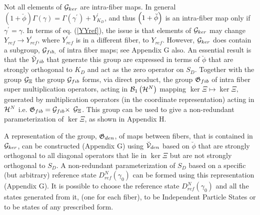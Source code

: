 Not all elements of ${\cal G}_{ker}$ are intra-fiber maps. In general $%
\left( 1+\breve{\phi}\right) \Gamma \left( \gamma \right) =\Gamma \left(
\gamma ^{\prime }\right) +Y_{K_{D}}^{\prime }$, and thus $\left( 1+\breve{%
\phi}\right) $ is an intra-fiber map only if $\gamma ^{\prime }=\gamma $. In
terms of eq. (\ref{YYref}), the issue is that elements of ${\cal G}_{ker}$
may change $Y_{ref}\rightarrow Y_{ref}^{\prime }$, where $Y_{ref}^{\prime }$
is in a different fiber, to $Y_{ref}$. However, ${\cal G}_{ker}$ does
contain a subgroup, ${\cal G}_{fib\text{,}}$ of intra fiber maps; see
Appendix G also. An essential result is that the ${\cal \breve{V}}_{fib}$
that generate this group are expressed in terms of $\breve{\phi}$ that are
strongly orthogonal to $K_{D}$ and act as the zero operator on $S_{D}$.
Together with the group ${\cal G}_{\Xi }$ the group ${\cal G}_{fib}$ forms,
via direct product, the group ${\frak G}_{fib}$ of intra fiber super
multiplication operators, acting in ${\cal B}_{1}\left( {\cal H}^{N}\right) $
mapping $\ker \Xi \mapsto \ker \Xi ,$ generated by multiplication operators
(in the coordinate representation) acting in ${\cal H}^{N}$ i.e. ${\frak G}%
_{fib}={\cal G}_{fib}\times $ ${\cal G}_{\Xi }$. This group can be used to
give a non-redundant parameterization of $\ker \Xi $, as shown in Appendix H.

A representation of the group, ${\frak G}_{den}$, of maps between fibers,
that is contained in ${\cal G}_{ker}$, can be constructed (Appendix G) using 
${\cal \breve{V}}_{den}$ based on $\breve{\phi}$ that are strongly
orthogonal to all diagonal operators that lie in $\ker \Xi $ but are not
strongly orthogonal to $S_{D}$. A non-redundant parameterization of $S_{D}$
based on a specific (but arbitrary) reference state $D_{ref}^{N}\left(
\gamma _{0}\right) $ can be formed using this representation (Appendix G).
It is possible to choose the reference state $D_{ref}^{N}\left( \gamma
_{0}\right) $ and all the states generated from it, (one for each fiber), to
be Independent Particle States or to be states of any prescribed form.

